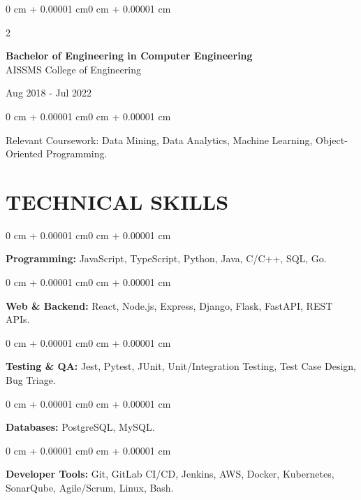 \documentclass[10pt, letterpaper]{article}
\newenvironment{onecolentry}{
    \begin{adjustwidth}{0 cm + 0.00001 cm}{0 cm + 0.00001 cm}
}{
    \end{adjustwidth}
}
\newenvironment{twocolentry}[2][]{
    \onecolentry
    \def\secondColumn{#2}
    \setcolumnwidth{\fill, 4.5 cm}
    \begin{paracol}{2}
}{
    \switchcolumn \raggedleft \secondColumn
    \end{paracol}
    \endonecolentry
}
\begin{document}
\begin{twocolentry}{
    Aug 2018 - Jul 2022
}
    \textbf{Bachelor of Engineering in Computer Engineering} \\
    AISSMS College of Engineering
\end{twocolentry}
\begin{onecolentry}
Relevant Coursework: Data Mining, Data Analytics, Machine Learning, Object-Oriented Programming.
\end{onecolentry}
\section{TECHNICAL SKILLS}
\begin{onecolentry}
\textbf{Programming:} JavaScript, TypeScript, Python, Java, C/C++, SQL, Go.
\end{onecolentry}
\vspace{0.06 cm}
\begin{onecolentry}
\textbf{Web \& Backend:} React, Node.js, Express, Django, Flask, FastAPI, REST APIs.
\end{onecolentry}
\vspace{0.06 cm}
\begin{onecolentry}
\textbf{Testing \& QA:} Jest, Pytest, JUnit, Unit/Integration Testing, Test Case Design, Bug Triage.
\end{onecolentry}
\vspace{0.06 cm}
\begin{onecolentry}
\textbf{Databases:} PostgreSQL, MySQL.
\end{onecolentry}
\vspace{0.06 cm}
\begin{onecolentry}
\textbf{Developer Tools:} Git, GitLab CI/CD, Jenkins, AWS, Docker, Kubernetes, SonarQube, Agile/Scrum, Linux, Bash.
\end{onecolentry}

\end{document}
